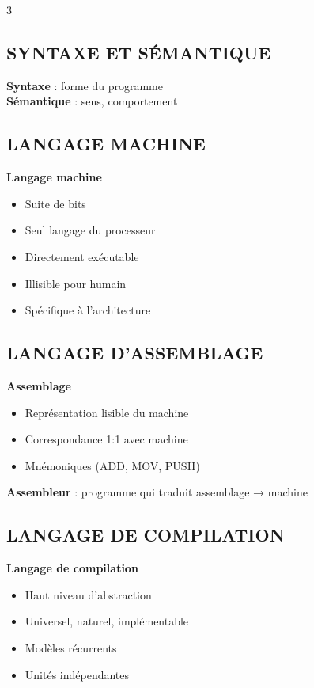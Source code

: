 \documentclass[10pt,a4paper,landscape]{article}
\begin{document}
\begin{multicols}{3}
\subsection*{SYNTAXE ET SÉMANTIQUE}

\begin{importbox}
\textbf{Syntaxe} : forme du programme\\
\textbf{Sémantique} : sens, comportement
\end{importbox}

\subsection*{LANGAGE MACHINE}

\begin{defbox}
\textbf{Langage machine}
\begin{itemize}
\item Suite de bits
\item Seul langage du processeur
\item Directement exécutable
\item Illisible pour humain
\item Spécifique à l'architecture
\end{itemize}
\end{defbox}

\subsection*{LANGAGE D'ASSEMBLAGE}

\begin{defbox}
\textbf{Assemblage}
\begin{itemize}
\item Représentation lisible du machine
\item Correspondance 1:1 avec machine
\item Mnémoniques (ADD, MOV, PUSH)
\end{itemize}
\end{defbox}

\begin{importbox}
\textbf{Assembleur} : programme qui traduit assemblage → machine
\end{importbox}

\subsection*{LANGAGE DE COMPILATION}

\begin{defbox}
\textbf{Langage de compilation}
\begin{itemize}
\item Haut niveau d'abstraction
\item Universel, naturel, implémentable
\item Modèles récurrents
\item Unités indépendantes
\end{itemize}
\end{defbox}


\end{multicols}
\end{document}
